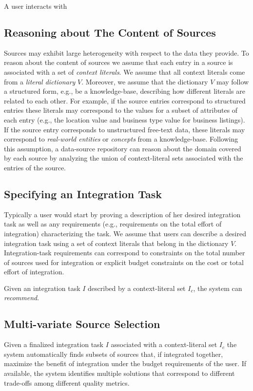 \documentclass{vldb}
\begin{document}
A user interacts with 

\subsection{Reasoning about The Content of Sources}
Sources may exhibit large heterogeneity with respect to the data they provide. To reason about the content of sources we assume that each entry in a source is associated with a set of {\em context literals}. We assume that all context literals come from a {\em literal dictionary} $V$. Moreover, we assume that the dictionary $V$ may follow a structured form, e.g., be a knowledge-base, describing how different literals are related to each other. For example, if the source entries correspond to structured entries these literals may correspond to the values for a subset of attributes of each entry (e.g., the location value and business type value for business listings). If the source entry corresponds to unstructured free-text data, these literals may correspond to {\em real-world entities} or {\em concepts} from a knowledge-base. Following this assumption, a data-source repository can reason about the domain covered by each source by analyzing the union of context-literal sets associated with the entries of the source. 

\subsection{Specifying an Integration Task}
Typically a user would start by proving a description of her desired integration task as well as any requirements (e.g., requirements on the total effort of integration) characterizing the task. We assume that users can describe a desired integration task using a set of context literals that belong in the dictionary $V$. Integration-task requirements can correspond to constraints on the total number of sources used for integration or explicit budget constraints on the cost or total effort of integration.

Given an integration task $I$ described by a  context-literal set $I_c$, the system can {\em recommend}.


\subsection{Multi-variate Source Selection}
Given a finalized integration task $I$ associated with a context-literal set $I_c$ the system automatically finds subsets of sources that, if integrated together, maximize the benefit of integration under the budget requirements of the user. If available, the system identifies multiple solutions that correspond to different trade-offs among different quality metrics.
\end{document}
